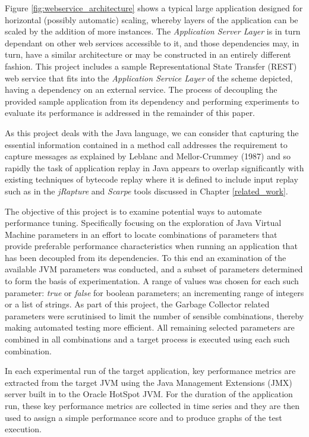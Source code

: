 \documentclass[]{final_report}
\begin{document}
Figure \ref{fig:webservice_architecture} shows a typical large application designed for horizontal (possibly automatic) scaling, whereby layers of the application can be scaled by the addition of more instances.\cite{el:2005} The \textit{Application Server Layer} is in turn dependant on other web services accessible to it, and those dependencies may, in turn, have a similar architecture or may be constructed in an entirely different fashion. This project includes a sample Representational State Transfer (REST) web service that fits into the \textit{Application Service Layer} of the scheme depicted, having a dependency on an external service. The process of decoupling the provided sample application from its dependency and performing experiments to evaluate its performance is addressed in the remainder of this paper.

As this project deals with the Java language, we can consider that capturing the essential information contained in a method call addresses the requirement to capture messages as explained by Leblanc and Mellor-Crummey (1987)\cite{leblanc:1987} and so rapidly the task of application replay in Java appears to overlap significantly with existing techniques of bytecode replay where it is defined to include input replay such as in the \textit{jRapture} \cite{steven:2000} and \textit{Scarpe} \cite{joshi:2007} tools discussed in Chapter \ref{related_work}.

The objective of this project is to examine potential ways to automate performance tuning. Specifically focusing on the exploration of Java Virtual Machine parameters in an effort to locate combinations of parameters that provide preferable performance characteristics when running an application that has been decoupled from its dependencies. To this end an examination of the available JVM parameters was conducted, and a subset of parameters determined to form the basis of experimentation. A range of values was chosen for each such parameter: \textit{true} or \textit{false} for boolean parameters; an incrementing range of integers or a list of strings. As part of this project, the Garbage Collector related parameters were scrutinised to limit the number of sensible combinations, thereby making automated testing more efficient. All remaining selected parameters are combined in all combinations and a target process is executed using each such combination.

In each experimental run of the target application, key performance metrics are extracted from the target JVM using the Java Management Extensions (JMX) server built in to the Oracle HotSpot JVM. For the duration of the application run, these key performance metrics are collected in time series and they are then used to assign a simple performance score and to produce graphs of the test execution.
\end{document}
